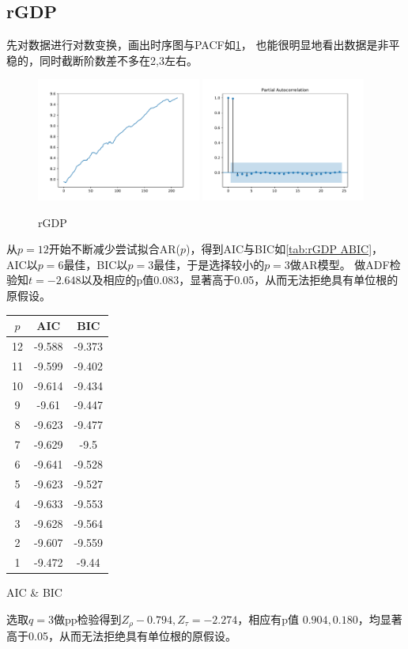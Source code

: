 \documentclass[cn]{homework}
\begin{document}
    \subsection{rGDP}
    先对数据进行对数变换，画出时序图与PACF如\cref{fig:rGDP}，
    也能很明显地看出数据是非平稳的，同时截断阶数差不多在2,3左右。
    \begin{figure}[h]
        \centering
        \includegraphics[width=0.48\textwidth]{rGDP-trend}
        \includegraphics[width=0.48\textwidth]{rGDP-pacf}
        \caption{rGDP}
        \label{fig:rGDP}
    \end{figure}

    从$p=12$开始不断减少尝试拟合AR($p$)，得到AIC与BIC如\cref{tab:rGDP ABIC}，
    AIC以$p=6$最佳，BIC以$p=3$最佳，于是选择较小的$p=3$做AR模型。
    做ADF检验知$t=-2.648$以及相应的p值$0.083$，显著高于0.05，从而无法拒绝具有单位根的原假设。
    \begin{margintable}
        \centering
        \begin{tabular}{ccc}
            \toprule
            $p$ & AIC & BIC \\
            \midrule
            12 & -9.588 & -9.373 \\
            11 & -9.599 & -9.402 \\
            10 & -9.614 & -9.434 \\
            9 & -9.61 & -9.447 \\
            8 & -9.623 & -9.477 \\
            7 & -9.629 & -9.5 \\
            6 & -9.641 & -9.528 \\
            5 & -9.623 & -9.527 \\
            4 & -9.633 & -9.553 \\
            3 & -9.628 & -9.564 \\
            2 & -9.607 & -9.559 \\
            1 & -9.472 & -9.44 \\
            \bottomrule
        \end{tabular}        
        \caption{AIC \& BIC}
        \label{tab:rGDP ABIC}
    \end{margintable}

    选取$q=3$做pp检验得到$Z_\rho-0.794,Z_\tau=-2.274$，相应有p值
    $0.904,0.180$，均显著高于0.05，从而无法拒绝具有单位根的原假设。
\end{document}
